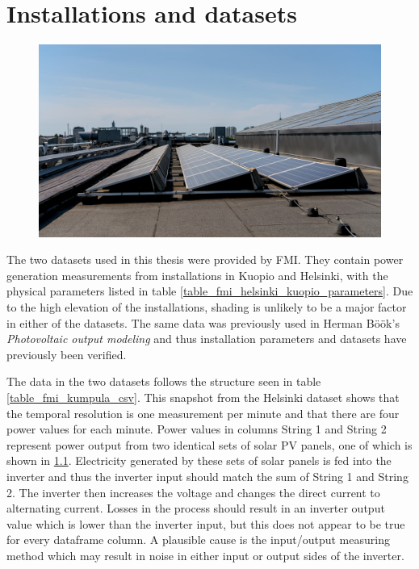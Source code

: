 \chapter{Installations and datasets}

\begin{figure}[h]
\centering
\includegraphics[width=0.8\linewidth]{pics/fmikumpula}
\label{fig_fmikumpula_panels}
\end{figure}


\noindent The two datasets used in this thesis were provided by FMI. They contain power generation measurements from installations in Kuopio and Helsinki, with the physical parameters listed in table \ref{table_fmi_helsinki_kuopio_parameters}. Due to the high elevation of the installations, shading is unlikely to be a major factor in either of the datasets. The same data was previously used in Herman Böök's \textit{Photovoltaic output modeling}\cite{hbook1} and thus installation parameters and datasets have previously been verified.

The data in the two datasets follows the structure seen in table \ref{table_fmi_kumpula_csv}. This snapshot from the Helsinki dataset shows that the temporal resolution is one measurement per minute and that there are four power values for each minute. Power values in columns String 1 and String 2 represent power output from two identical sets of solar PV panels, one of which is shown in \ref{fig_fmikumpula_panels}. Electricity generated by these sets of solar panels is fed into the inverter and thus the inverter input should match the sum of String 1 and String 2. The inverter then increases the voltage and changes the direct current to alternating current. Losses in the process should result in an inverter output value which is lower than the inverter input, but this does not appear to be true for every dataframe column. A plausible cause is the input/output measuring method which may result in noise in either input or output sides of the inverter.


